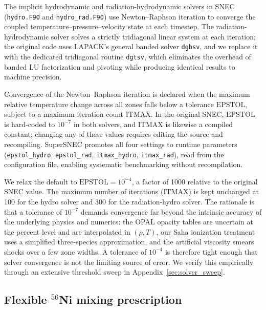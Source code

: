\documentclass[twocolumn,linenumbers]{aastex701}
\begin{document}
The implicit hydrodynamic and radiation-hydrodynamic solvers in SNEC (\texttt{hydro.F90} and \texttt{hydro\_rad.F90}) use Newton--Raphson iteration to converge the coupled temperature--pressure--velocity state at each timestep. The radiation-hydrodynamic solver solves a strictly tridiagonal linear system at each iteration; the original code uses LAPACK's general banded solver \texttt{dgbsv}, and we replace it with the dedicated tridiagonal routine \texttt{dgtsv}, which eliminates the overhead of banded LU factorization and pivoting while producing identical results to machine precision.

Convergence of the Newton--Raphson iteration is declared when the maximum relative temperature change across all zones falls below a tolerance $\mathrm{EPSTOL}$, subject to a maximum iteration count $\mathrm{ITMAX}$. In the original SNEC, $\mathrm{EPSTOL}$ is hard-coded to $10^{-7}$ in both solvers, and $\mathrm{ITMAX}$ is likewise a compiled constant; changing any of these values requires editing the source and recompiling. SuperSNEC promotes all four settings to runtime parameters (\texttt{epstol\_hydro}, \texttt{epstol\_rad}, \texttt{itmax\_hydro}, \texttt{itmax\_rad}), read from the configuration file, enabling systematic benchmarking without recompilation.

We relax the default to $\mathrm{EPSTOL} = 10^{-4}$, a factor of 1000 relative to the original SNEC value. The maximum number of iterations ($\mathrm{ITMAX}$) is kept unchanged at 100 for the hydro solver and 300 for the radiation-hydro solver. The rationale is that a tolerance of $10^{-7}$ demands convergence far beyond the intrinsic accuracy of the underlying physics and numerics: the OPAL opacity tables \citep{Iglesias1996} are uncertain at the percent level and are interpolated in $(\rho,T)$, our Saha ionization treatment uses a simplified three-species approximation, and the artificial viscosity \citep{VonNeumann1950} smears shocks over a few zone widths. A tolerance of $10^{-4}$ is therefore tight enough that solver convergence is not the limiting source of error. We verify this empirically through an extensive threshold sweep in Appendix~\ref{sec:solver_sweep}.

\subsection{Flexible $^{56}$Ni mixing prescription}
\label{sec:ni_mixing}
\end{document}

